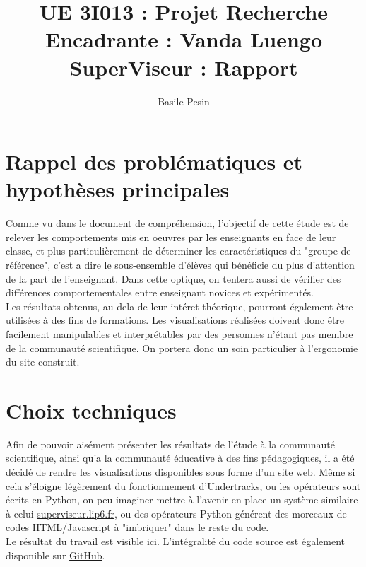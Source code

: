 \documentclass{article}
\title{UE 3I013 : Projet Recherche\\
    Encadrante : Vanda Luengo\\
    SuperViseur : Rapport}
\author{Basile Pesin}
\begin{document}
\maketitle
\newpage

\section{Rappel des problématiques et hypothèses principales}
Comme vu dans le document de compréhension, l'objectif de cette étude \cite{SuperViseur} est de relever les comportements mis en oeuvres par les enseignants en face de leur classe, et plus particulièrement de déterminer les caractéristiques du "groupe de référence", c'est a dire le sous-ensemble d'élèves qui bénéficie du plus d'attention de la part de l'enseignant. Dans cette optique, on tentera aussi de vérifier des différences comportementales entre enseignant novices et expérimentés.\\
Les résultats obtenus, au dela de leur intéret théorique, pourront également être utilisées à des fins de formations. Les visualisations réalisées doivent donc être facilement manipulables et interprétables par des personnes n'étant pas membre de la communauté scientifique. On portera donc un soin particulier à l'ergonomie du site construit.

\section{Choix techniques}
Afin de pouvoir aisément présenter les résultats de l'étude à la communauté scientifique, ainsi qu'a la communauté éducative à des fins pédagogiques, il a été décidé de rendre les visualisations disponibles sous forme d'un site web. Même si cela s'éloigne légèrement du fonctionnement d'\href{https://undertracks.imag.fr}{Undertracks}, ou les opérateurs sont écrits en Python, on peu imaginer mettre à l'avenir en place un système similaire à celui \href{http://superviseur.lip6.fr}{superviseur.lip6.fr}, ou des opérateurs Python générent des morceaux de codes HTML/Javascript à "imbriquer" dans le reste du code.\\
Le résultat du travail est visible \href{https://vertmo.github.io/SuperViseur/}{ici}. L'intégralité du code source est également disponible sur \href{https://github.com/Vertmo/SuperViseur}{GitHub}.
\end{document}

